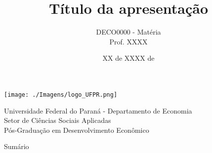 \documentclass[aspectratio=169, 9pt]{beamer}
\title[short-title]{Título da apresentação}
\author[Felipe Duplat Luz]{DECO0000 - Matéria \\ Prof. XXXX}
\institute[UFPR] %
{
    \vspace{0.5mm} {\normalsize Felipe Duplat Luz} \vspace{5mm}
}
\date{XX de XXXX de \the\year{}}
\begin{document}
\begin{frame}[plain]
    \begin{center}
            \begin{minipage}[c]{0.2\linewidth}
                    \begin{center}
                    \texttt{[image: ./Imagens/logo\_UFPR.png]} 
                    \end{center}
            \end{minipage}
            \begin{minipage}[c]{0.7\linewidth}
                    \begin{flushleft}
                    \begin{large}
                    Universidade Federal do Paraná - Departamento de Economia \\ \vspace{1mm} Setor de Ciências Sociais Aplicadas \\
                    \vspace{1mm} Pós-Graduação em Desenvolvimento Econômico
                    \end{large} 
                    \end{flushleft}
            \end{minipage}
    \end{center}
\titlepage 
\end{frame}


\begingroup
{}
\begin{frame}{Sumário}
	\tableofcontents[hideallsubsections]
\end{frame}
\endgroup




\nocite{*}









\end{document}
